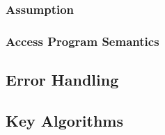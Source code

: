 \documentclass[12pt]{article}
\begin{document}
\subsubsection{Assumption}%

\subsubsection{Access Program Semantics}%

\subsection{Error Handling}

\subsection{Key Algorithms}
\end{document}
